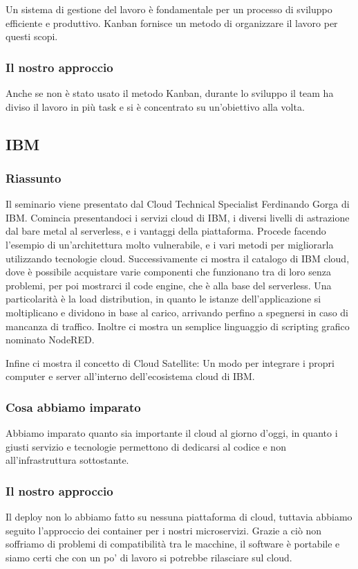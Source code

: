 \documentclass{report}
\begin{document}
Un sistema di gestione del lavoro è fondamentale per un processo di sviluppo efficiente e produttivo. Kanban fornisce un metodo di organizzare il lavoro per questi scopi.

\subsubsection*{Il nostro approccio}

Anche se non è stato usato il metodo Kanban, durante lo sviluppo il team ha diviso il lavoro in più task e si è concentrato su un'obiettivo alla volta.

\subsection{IBM}
\subsubsection*{Riassunto}
Il seminario viene  presentato dal Cloud Technical Specialist Ferdinando Gorga di IBM.
Comincia presentandoci i servizi cloud di IBM, i diversi livelli di astrazione dal bare metal al serverless, e i vantaggi della piattaforma.
Procede facendo l'esempio di un'architettura molto vulnerabile, e i vari metodi per migliorarla utilizzando tecnologie cloud.
Successivamente ci mostra il catalogo di IBM cloud, dove è possibile acquistare varie componenti che funzionano tra di loro senza problemi, per poi mostrarci il code engine, che è alla base del serverless. Una particolarità è la load distribution, in quanto le istanze dell'applicazione si moltiplicano e dividono in base al carico,
arrivando perfino a spegnersi in caso di mancanza di traffico. 
Inoltre ci mostra un semplice linguaggio di scripting grafico nominato NodeRED.

Infine ci mostra il concetto di Cloud Satellite: Un modo per integrare i propri computer e server all'interno dell'ecosistema cloud di IBM.
\subsubsection*{Cosa abbiamo imparato}
Abbiamo imparato quanto sia importante il cloud al giorno d'oggi, in quanto i giusti servizio e tecnologie permettono di dedicarsi al codice e non all'infrastruttura sottostante.
\subsubsection*{Il nostro approccio}
Il deploy non lo abbiamo fatto su nessuna piattaforma di cloud, tuttavia abbiamo seguito l'approccio dei container per i nostri microservizi. 
Grazie a ciò non soffriamo di problemi di compatibilità tra le macchine, il software è portabile e siamo certi che con un po' di lavoro si potrebbe rilasciare sul cloud.
\end{document}
